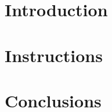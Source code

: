 \documentclass[
12pt, %
a4paper, %
twoside, %
headinclude,footinclude, %
BCOR5mm, %
]{scrartcl}
\begin{document}
\newpage %

\section{Introduction}
\label{sec:introduction}


\section{Instructions}
\label{sec:instructions}


\section{Conclusions}
\label{sec:summary}



\theendnotes

\printbibliography[heading=none]
\end{document}
